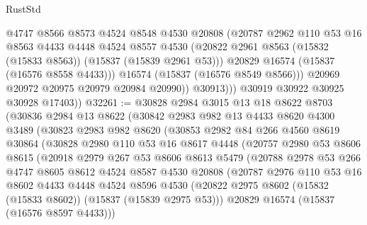 \begin{lexlean}{RustStd}
\begin{coremodule}
{\begin{coremodule}
{{{{{{{{{{{{{{{{{{{{{{{{{{{{{{{{{{{{{{{{{{{{{{{{{{{{{{{{{{{{                    @4747
                    @8566
                    @8573
                    @4524
                    @8548
                    @4530
                    @20808
                    (@20787
                      @2962
                      @110
                      @53
                      @16
                      @8563
                      @4433
                      @4448
                      @4524
                      @8557
                      @4530
                      (@20822 @2961 @8563 (@15832 (@15833 @8563)) (@15837 (@15839 @2961 @53)))
                      @20829
                      @16574
                      (@15837 (@16576 @8558 @4433)))
                    @16574
                    (@15837 (@16576 @8549 @8566)))
                  @20969
                  @20972
                  @20975
                  @20979
                  @20984
                  @20990))
              @30913)))
        @30919
        @30922
        @30925
        @30928
        @17403))
@32261 := @30828
    @2984
    @3015
    @13
    @18
    @8622
    @8703
    (@30836
      @2984
      @13
      @8622
      (@30842
        @2983
        @982
        @13
        @4433
        @8620
        @4300
        @3489
        (@30823
          @2983
          @982
          @8620
          (@30853
            @2982
            @84
            @266
            @4560
            @8619
            @30864
            (@30828
              @2980
              @110
              @53
              @16
              @8617
              @4448
              (@20757
                @2980
                @53
                @8606
                @8615
                (@20918
                  @2979
                  @267
                  @53
                  @8606
                  @8613
                  @5479
                  (@20788
                    @2978
                    @53
                    @266
                    @4747
                    @8605
                    @8612
                    @4524
                    @8587
                    @4530
                    @20808
                    (@20787
                      @2976
                      @110
                      @53
                      @16
                      @8602
                      @4433
                      @4448
                      @4524
                      @8596
                      @4530
                      (@20822 @2975 @8602 (@15832 (@15833 @8602)) (@15837 (@15839 @2975 @53)))
                      @20829
                      @16574
                      (@15837 (@16576 @8597 @4433)))
}}}}}}}}}}}}}}}}}}}}}}}}}}}}}}}}}}}}}}}}}}}}}}}}}}}}}}}}}}}}
\end{coremodule}}
\end{coremodule}
\end{lexlean}
